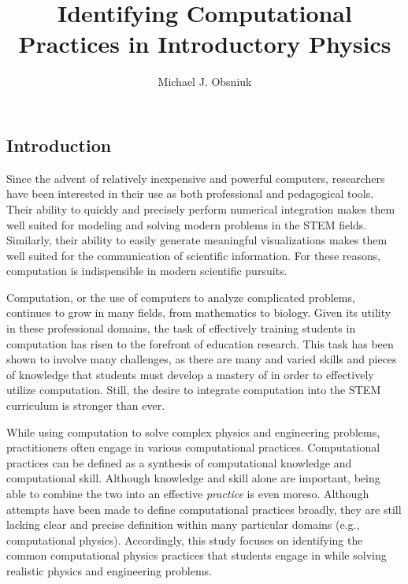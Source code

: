 \documentclass{msuphddissertation}
\author{Michael J. Obsniuk}
\title{Identifying Computational Practices in Introductory Physics}
\begin{document}
\maketitlepage

\begin{abstract}
\end{abstract}

\TOC
\LOT
\LOF

\newpage
{}
\begin{doublespace}

%
%

\chapter{Introduction}\label{CH1:Introduction}

Since the advent of relatively inexpensive and powerful computers, researchers have been interested in their use as both professional and pedagogical tools.  Their ability to quickly and precisely perform numerical integration makes them well suited for modeling and solving modern problems in the STEM fields.  Similarly, their ability to easily generate meaningful visualizations makes them well suited for the communication of scientific information.  For these reasons, computation is indispensible in modern scientific pursuits.

Computation, or the use of computers to analyze complicated problems, continues to grow in many fields, from mathematics to biology.  Given its utility in these professional domains, the task of effectively training students in computation has risen to the forefront of education research.  This task has been shown to involve many challenges, as there are many and varied skills and pieces of knowledge that students must develop a mastery of in order to effectively utilize computation.  Still, the desire to integrate computation into the STEM curriculum is stronger than ever.

While using computation to solve complex physics and engineering problems, practitioners often engage in various computational practices.  Computational practices can be defined as a synthesis of computational knowledge and computational skill.  Although knowledge and skill alone are important, being able to combine the two into an effective \textit{practice} is even moreso.  Although attempts have been made to define computational practices broadly, they are still lacking clear and precise definition within many particular domains (e.g., computational physics). Accordingly, this study focuses on identifying the common computational physics practices that students engage in while solving realistic physics and engineering problems.


\end{doublespace}
\end{document}
